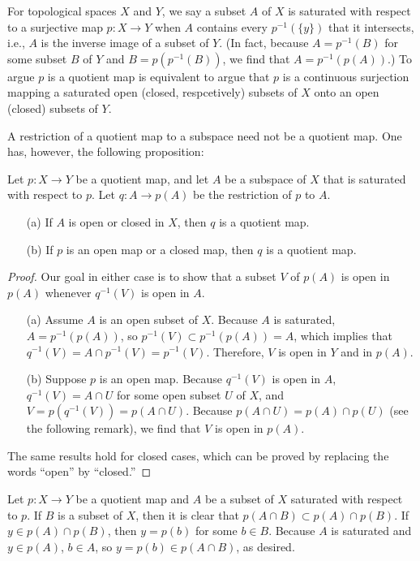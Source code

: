For topological spaces $X$ and $Y$, we say a subset $A$ of $X$ is saturated with respect to a surjective map $p: X\rightarrow Y$ when $A$ contains every $p^{-1}(\{y\})$ that it intersects, i.e., $A$ is the inverse image of a subset of $Y$.
(In fact, because $A=p^{-1}(B)$ for some subset $B$ of $Y$ and $B=p(p^{-1}(B))$, we find that $A=p^{-1}(p(A))$.)
To argue $p$ is a quotient map is equivalent to argue that $p$ is a continuous surjection mapping a saturated open (closed, respcetively) subsets of $X$ onto an open (closed) subsets of $Y$.

A restriction of a quotient map to a subspace need not be a quotient map.
One has, however, the following proposition:
\begin{prop}
    Let $p: X\rightarrow Y$ be a quotient map, and let $A$ be a subspace of $X$ that is saturated with respect to $p$.
    Let $q: A\rightarrow p(A)$ be the restriction of $p$ to $A$.
    \begin{enumerate}
        \item[(a)]
        {
            If $A$ is open or closed in $X$, then $q$ is a quotient map.
        }
        \item[(b)]
        {
            If $p$ is an open map or a closed map, then $q$ is a quotient map.
        }
    \end{enumerate}
\end{prop}
\begin{proof}
    Our goal in either case is to show that a subset $V$ of $p(A)$ is open in $p(A)$ whenever $q^{-1}(V)$ is open in $A$.
    \begin{enumerate}
        \item[(a)]
        {
            Assume $A$ is an open subset of $X$.
            Because $A$ is saturated, $A=p^{-1}(p(A))$, so $p^{-1}(V)\subset p^{-1}(p(A))=A$, which implies that $q^{-1}(V)=A\cap p^{-1}(V)=p^{-1}(V)$.
            Therefore, $V$ is open in $Y$ and in $p(A)$.
        }
        \item[(b)]
        {
            Suppose $p$ is an open map.
            Because $q^{-1}(V)$ is open in $A$, $q^{-1}(V)=A\cap U$ for some open subset $U$ of $X$, and $V=p(q^{-1}(V))=p(A\cap U)$.
            Because $p(A\cap U)=p(A)\cap p(U)$ (see the following remark), we find that $V$ is open in $p(A)$.
        }
    \end{enumerate}
    The same results hold for closed cases, which can be proved by replacing the words ``open'' by ``closed.''
\end{proof}
\begin{rmk}
    Let $p: X\rightarrow Y$ be a quotient map and $A$ be a subset of $X$ saturated with respect to $p$.
    If $B$ is a subset of $X$, then it is clear that $p(A\cap B)\subset p(A)\cap p(B)$.
    If $y\in p(A)\cap p(B)$, then $y=p(b)$ for some $b\in B$.
    Because $A$ is saturated and $y\in p(A)$, $b\in A$, so $y=p(b)\in p(A\cap B)$, as desired.
\end{rmk}

